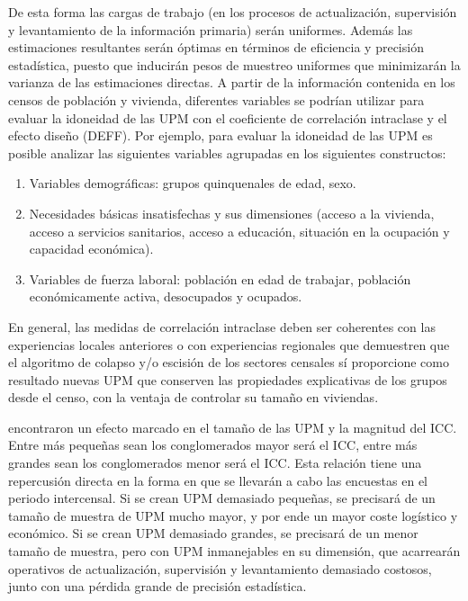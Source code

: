 \documentclass[
  12pt,
  spanish,
]{book}
\providecommand{\tightlist}{%
  \setlength{\itemsep}{0pt}\setlength{\parskip}{0pt}}
\begin{document}
De esta forma las cargas de trabajo (en los procesos de actualización, supervisión y levantamiento de la información primaria) serán uniformes. Además las estimaciones resultantes serán óptimas en términos de eficiencia y precisión estadística, puesto que inducirán pesos de muestreo uniformes que minimizarán la varianza de las estimaciones directas. A partir de la información contenida en los censos de población y vivienda, diferentes variables se podrían utilizar para evaluar la idoneidad de las UPM con el coeficiente de correlación intraclase y el efecto diseño (DEFF). Por ejemplo, para evaluar la idoneidad de las UPM es posible analizar las siguientes variables agrupadas en los siguientes constructos:

\begin{enumerate}
\def\labelenumi{\arabic{enumi}.}
\tightlist
\item
  Variables demográficas: grupos quinquenales de edad, sexo.
\item
  Necesidades básicas insatisfechas y sus dimensiones (acceso a la vivienda, acceso a servicios sanitarios, acceso a educación, situación en la ocupación y capacidad económica).
\item
  Variables de fuerza laboral: población en edad de trabajar, población económicamente activa, desocupados y ocupados.
\end{enumerate}

En general, las medidas de correlación intraclase deben ser coherentes con las experiencias locales anteriores o con experiencias regionales que demuestren que el algoritmo de colapso y/o escisión de los sectores censales sí proporcione como resultado nuevas UPM que conserven las propiedades explicativas de los grupos desde el censo, con la ventaja de controlar su tamaño en viviendas.

\citet{hansen1953sample} encontraron un efecto marcado en el tamaño de las UPM y la magnitud del ICC. Entre más pequeñas sean los conglomerados mayor será el ICC, entre más grandes sean los conglomerados menor será el ICC. Esta relación tiene una repercusión directa en la forma en que se llevarán a cabo las encuestas en el periodo intercensal. Si se crean UPM demasiado pequeñas, se precisará de un tamaño de muestra de UPM mucho mayor, y por ende un mayor coste logístico y económico. Si se crean UPM demasiado grandes, se precisará de un menor tamaño de muestra, pero con UPM inmanejables en su dimensión, que acarrearán operativos de actualización, supervisión y levantamiento demasiado costosos, junto con una pérdida grande de precisión estadística.
\end{document}
